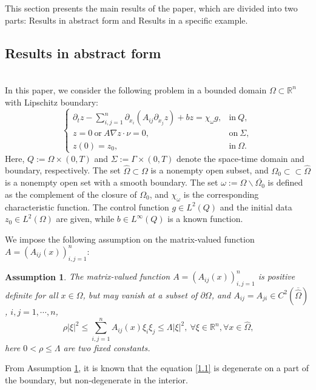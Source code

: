 \documentclass[9pt,reqno]{amsart}
\theoremstyle{plain}
\newtheorem{assumption}[theorem]{Assumption}
\numberwithin{equation}{section}
\numberwithin{theorem}{section}
\def\Om{\Omega}
\def\Om{\Omega}
\begin{document}
	This section presents the main results of the paper, which are divided into two parts: Results in abstract form and Results in a specific example.
	\subsection{Results in abstract form}
	
	\hspace*{\fill}\\
	
	In this paper, we consider the following problem in a bounded domain $\Omega\subset \mathbb{R}^n$ with Lipschitz boundary:
	\begin{equation}\label{1.1}
		\begin{cases}
			\partial_{t}z - \sum_{i,j=1}^n\partial_{x_i}(A_{ij}\partial_{x_j}z) + bz=\chi_{\omega}g, & \mbox{in} \ Q,  \\
			z=0 \ \mbox{or} \ A\nabla z \cdot \nu =0,  & \mbox{on} \ \Sigma,  \\
			z(0)= z_{0},  & \mbox{in} \ \Omega.  
		\end{cases}
	\end{equation}
	Here, $Q:=\Omega\times (0,T)$ and $\Sigma:= \Gamma\times(0,T)$ denote the space-time domain and boundary, respectively. The set $\hat{\Omega}\subset \Omega$ is a nonempty open subset, and $\Omega_0 \subset\subset \hat{\Omega}$ is a nonempty open set with a smooth boundary. The set $\omega:=\Omega\backslash\overline{\Omega_0}$ is defined as the complement of the closure of $\Omega_0$, and $\chi_{\omega}$ is the corresponding characteristic function. The control function $g \in L^{2}(Q)$ and the initial data $z_0 \in L^{2}(\Omega)$ are given, while $b\in L^{\infty}(Q)$ is a known function.
	
	We impose the following assumption on the matrix-valued function $A=(A_{ij}(x))_{i,j=1}^n$:
	
	\begin{assumption}\label{assume1}
		The matrix-valued function $A=(A_{ij}(x))_{i,j=1}^n$ is positive definite for all $x \in \Om$, but may vanish at a subset of $\partial\Omega$, and $A_{ij}=A_{ji}\in C^2(\overline{\hat{\Om}})$, $i,j=1,\cdots, n$, 
		$$
		\ \rho|\xi|^2 \le \sum_{i,j=1}^n A_{ij}(x)\xi_i\xi_j \le \Lambda |\xi|^2, \ \forall \xi\in\mathbb{R}^n, \forall x \in \hat{\Om}, 
		$$
		here $0<\rho \le \Lambda$ are two fixed constants.
	\end{assumption}
	From Assumption \ref{assume1}, it is known that the equation \eqref{1.1} is degenerate on a part of the boundary, but non-degenerate in the interior.
	
\end{document}
